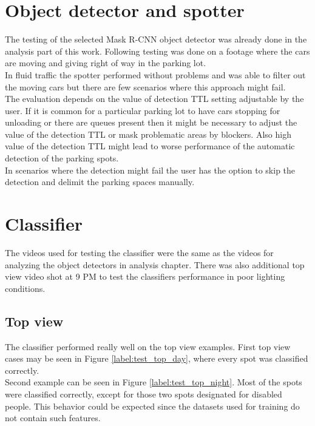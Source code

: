 \documentclass[thesis=M,english]{FITthesis}[2019/03/06]
\begin{document}
\section{Object detector and spotter}
The testing of the selected Mask R-CNN object detector was already done in the analysis part of this work. Following testing was done on a footage where the cars are moving and giving right of way in the parking lot.\\

In fluid traffic the spotter performed without problems and was able to filter out the moving cars but there are few scenarios where this approach might fail.\\

The evaluation depends on the value of detection TTL setting adjustable by the user. If it is common for a particular parking lot to have cars stopping for unloading or there are queues present then it might be necessary to adjust the value of the detection TTL or mask problematic areas by blockers. Also high value of the detection TTL might lead to worse performance of the automatic detection of the parking spots.\\

In scenarios where the detection might fail the user has the option to skip the detection and delimit the parking spaces manually.




\section{Classifier}
The videos used for testing the classifier were the same as the videos for analyzing the object detectors in analysis chapter. There was also additional top view video shot at 9 PM to test the classifiers performance in poor lighting conditions.

\subsection{Top view}
The classifier performed really well on the top view examples. First top view cases may be seen in Figure \ref{label:test_top_day}, where every spot was classified correctly.\\

Second example can be seen in Figure \ref{label:test_top_night}. Most of the spots were classified correctly, except for those two spots designated for disabled people. This behavior could be expected since the datasets used for training do not contain such features.\\
\end{document}
